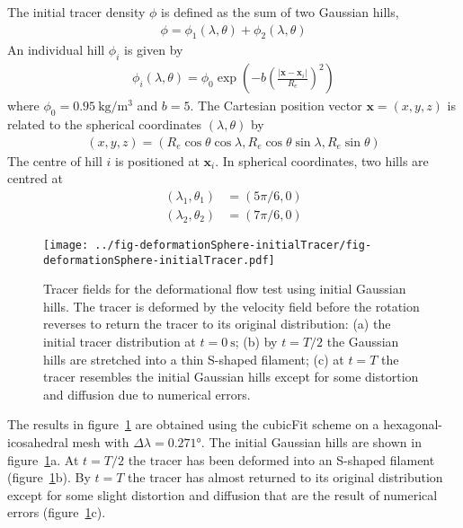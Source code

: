 The initial tracer density $\phi$ is defined as the sum of two Gaussian hills,
\begin{align}
	\phi = \phi_1(\lambda, \theta) + \phi_2(\lambda, \theta)
\end{align}
An individual hill $\phi_i$ is given by
\begin{align}
	\phi_i(\lambda, \theta) = \phi_0 \exp\left( -b \left( \frac{|\mathbf{x} - \mathbf{x}_i|}{R_e} \right)^2 \right)
\end{align}
where $\phi_0 = \SI{0.95}{\kilo\gram\per\meter\cubed}$ and $b = 5$.  The Cartesian position vector $\mathbf{x} = (x,y,z)$ is related to the spherical coordinates $(\lambda, \theta)$ by
\begin{align}
	(x,y,z) = (R_e \cos \theta \cos \lambda, R_e \cos \theta \sin \lambda, R_e \sin \theta) \label{eqn:spherical-cartesian}
\end{align}
The centre of hill $i$ is positioned at $\mathbf{x}_i$.  In spherical coordinates, two hills are centred at
\begin{align}
	(\lambda_1,\theta_1) &= (5 \pi /6, 0) \\
	(\lambda_2,\theta_2) &= (7 \pi /6, 0)
\end{align}

\begin{figure}
	\centering
	\texttt{[image: ../fig-deformationSphere-initialTracer/fig-deformationSphere-initialTracer.pdf]}
	\caption{Tracer fields for the deformational flow test using initial Gaussian hills.  The tracer is deformed by the velocity field before the rotation reverses to return the tracer to its original distribution: (a) the initial tracer distribution at $t = \SI{0}{\second}$; (b) by $t=T/2$ the Gaussian hills are stretched into a thin S-shaped filament; (c) at $t=T$ the tracer resembles the initial Gaussian hills except for some distortion and diffusion due to numerical errors.}
	\label{fig:deformationSphere-evolution}
\end{figure}

The results in figure~\ref{fig:deformationSphere-evolution} are obtained using the cubicFit scheme on a hexagonal-icosahedral mesh with $\Delta \lambda = \ang{0.271}$.  The initial Gaussian hills are shown in figure~\ref{fig:deformationSphere-evolution}a.  At $t=T/2$ the tracer has been deformed into an S-shaped filament (figure~\ref{fig:deformationSphere-evolution}b).  By $t=T$ the tracer has almost returned to its original distribution except for some slight distortion and diffusion that are the result of numerical errors (figure~\ref{fig:deformationSphere-evolution}c).

